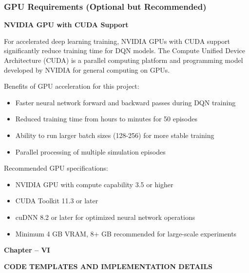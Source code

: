 \documentclass[12pt,a4paper]{article}
\begin{document}
\subsubsection{GPU Requirements (Optional but Recommended)}

\textbf{NVIDIA GPU with CUDA Support}

For accelerated deep learning training, NVIDIA GPUs with CUDA support significantly reduce training time for DQN models. The Compute Unified Device Architecture (CUDA) is a parallel computing platform and programming model developed by NVIDIA for general computing on GPUs.

Benefits of GPU acceleration for this project:

\begin{itemize}
    \item Faster neural network forward and backward passes during DQN training
    \item Reduced training time from hours to minutes for 50 episodes
    \item Ability to run larger batch sizes (128-256) for more stable training
    \item Parallel processing of multiple simulation episodes
\end{itemize}

Recommended GPU specifications:

\begin{itemize}
    \item NVIDIA GPU with compute capability 3.5 or higher
    \item CUDA Toolkit 11.3 or later
    \item cuDNN 8.2 or later for optimized neural network operations
    \item Minimum 4 GB VRAM, 8+ GB recommended for large-scale experiments
\end{itemize}


\thispagestyle{plain}


\clearpage

\begin{center}
    \vspace*{10cm}
    
    {\fontsize{16}{19.2}\selectfont\bfseries
    Chapter -- VI}
    
    \vspace{1cm}
    
    {\fontsize{16}{19.2}\selectfont\bfseries
    CODE TEMPLATES AND IMPLEMENTATION DETAILS}
    
    \vspace*{\fill}
\end{center}
\end{document}
